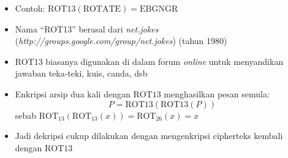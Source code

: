 \documentclass{article}
\begin{document}

\begin{itemize}
    \item Contoh: $\text{ROT13}(\text{ROTATE}) = \text{EBGNGR}$
    \item Nama ``ROT13'' berasal dari \textit{net.jokes} (\textit{http://groups.google.com/group/net.jokes}) (tahun 1980)
    \item ROT13 biasanya digunakan di dalam forum \textit{online} untuk menyandikan jawaban teka-teki, kuis, canda, dsb
    \item Enkripsi arsip dua kali dengan $\text{ROT13}$ menghasilkan pesan semula:
    \[ P = \text{ROT13}(\text{ROT13}(P)) \]
    sebab $\text{ROT}_{13}(\text{ROT}_{13}(x)) = \text{ROT}_{26}(x) = x$
    \item Jadi dekripsi cukup dilakukan dengan mengenkripsi cipherteks kembali dengan $\text{ROT13}$
\end{itemize}
\end{document}
